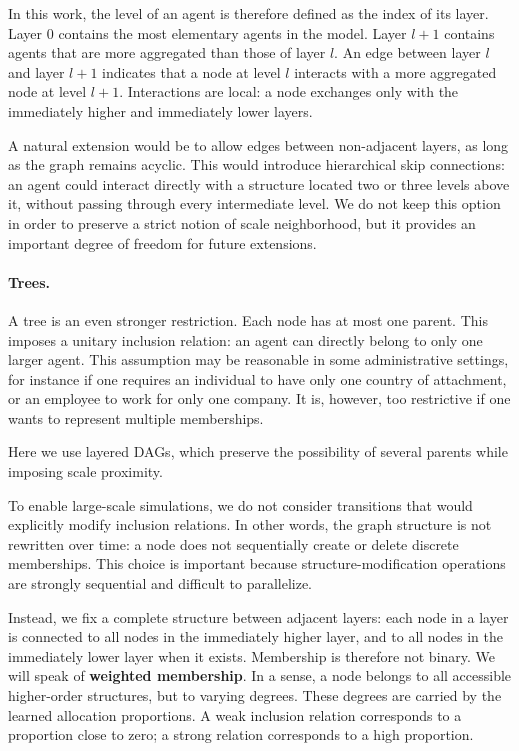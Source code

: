 \documentclass[11pt]{article}
\begin{document}
In this work, the level of an agent is therefore defined as the index of its layer. Layer $0$ contains the most elementary agents in the model. Layer $l+1$ contains agents that are more aggregated than those of layer $l$. An edge between layer $l$ and layer $l+1$ indicates that a node at level $l$ interacts with a more aggregated node at level $l+1$. Interactions are local: a node exchanges only with the immediately higher and immediately lower layers.

A natural extension would be to allow edges between non-adjacent layers, as long as the graph remains acyclic. This would introduce hierarchical skip connections: an agent could interact directly with a structure located two or three levels above it, without passing through every intermediate level. We do not keep this option in order to preserve a strict notion of scale neighborhood, but it provides an important degree of freedom for future extensions.

\paragraph{Trees.}
A tree is an even stronger restriction. Each node has at most one parent. This imposes a unitary inclusion relation: an agent can directly belong to only one larger agent. This assumption may be reasonable in some administrative settings, for instance if one requires an individual to have only one country of attachment, or an employee to work for only one company. It is, however, too restrictive if one wants to represent multiple memberships.

Here we use layered DAGs, which preserve the possibility of several parents while imposing scale proximity.

To enable large-scale simulations, we do not consider transitions that would explicitly modify inclusion relations. In other words, the graph structure is not rewritten over time: a node does not sequentially create or delete discrete memberships. This choice is important because structure-modification operations are strongly sequential and difficult to parallelize.

Instead, we fix a complete structure between adjacent layers: each node in a layer is connected to all nodes in the immediately higher layer, and to all nodes in the immediately lower layer when it exists. Membership is therefore not binary. We will speak of \textbf{weighted membership}. In a sense, a node belongs to all accessible higher-order structures, but to varying degrees. These degrees are carried by the learned allocation proportions. A weak inclusion relation corresponds to a proportion close to zero; a strong relation corresponds to a high proportion.
\end{document}
